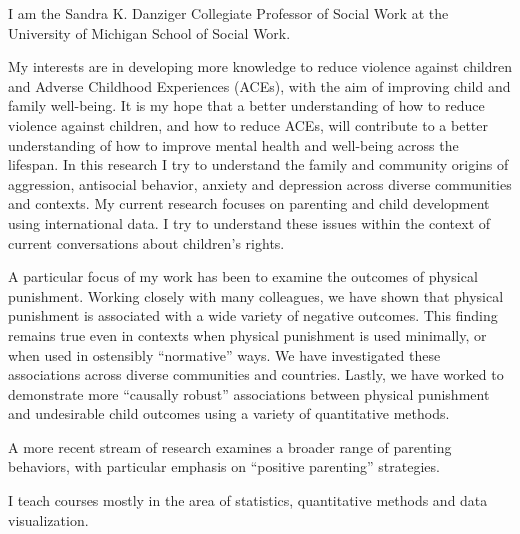 \documentclass[
  letterpaper,
  DIV=11,
  numbers=noendperiod]{scrreprt}
\begin{document}
I am the Sandra K. Danziger Collegiate Professor of Social Work at the
University of Michigan School of Social Work.

My interests are in developing more knowledge to reduce violence against
children and Adverse Childhood Experiences (ACEs), with the aim of
improving child and family well-being. It is my hope that a better
understanding of how to reduce violence against children, and how to
reduce ACEs, will contribute to a better understanding of how to improve
mental health and well-being across the lifespan. In this research I try
to understand the family and community origins of aggression, antisocial
behavior, anxiety and depression across diverse communities and
contexts. My current research focuses on parenting and child development
using international data. I try to understand these issues within the
context of current conversations about children's rights.

A particular focus of my work has been to examine the outcomes of
physical punishment. Working closely with many colleagues, we have shown
that physical punishment is associated with a wide variety of negative
outcomes. This finding remains true even in contexts when physical
punishment is used minimally, or when used in ostensibly ``normative''
ways. We have investigated these associations across diverse communities
and countries. Lastly, we have worked to demonstrate more ``causally
robust'' associations between physical punishment and undesirable child
outcomes using a variety of quantitative methods.

A more recent stream of research examines a broader range of parenting
behaviors, with particular emphasis on ``positive parenting''
strategies.

I teach courses mostly in the area of statistics, quantitative methods
and data visualization.



\printindex
\end{document}
